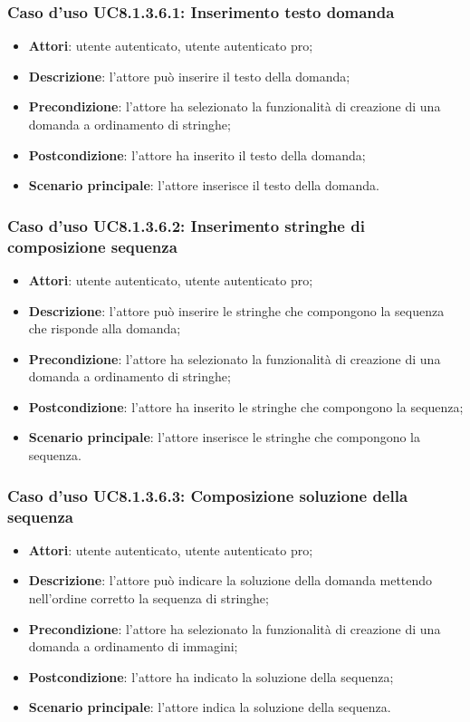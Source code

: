 \subsubsection{Caso d'uso UC8.1.3.6.1: Inserimento testo domanda}
	\begin{itemize}
		\item \textbf{Attori}: utente autenticato, utente autenticato pro;
		\item \textbf{Descrizione}: l'attore può inserire il testo della domanda;
		\item\textbf{Precondizione}: l'attore ha selezionato la funzionalità di creazione di una domanda a ordinamento di stringhe;
		\item \textbf{Postcondizione}: l'attore ha inserito il testo della domanda;
		\item\textbf{Scenario principale}: l'attore inserisce il testo della domanda.
	\end{itemize}
	
\subsubsection{Caso d'uso UC8.1.3.6.2: Inserimento stringhe di composizione sequenza}
	\begin{itemize}
		\item \textbf{Attori}: utente autenticato, utente autenticato pro;
		\item \textbf{Descrizione}: l'attore può inserire le stringhe che compongono la sequenza che risponde alla domanda;
		\item\textbf{Precondizione}: l'attore ha selezionato la funzionalità di creazione di una domanda a ordinamento di stringhe;
		\item \textbf{Postcondizione}: l'attore ha inserito le stringhe che compongono la sequenza;
		\item\textbf{Scenario principale}: l'attore inserisce le stringhe che compongono la sequenza.
	\end{itemize}
	
\subsubsection{Caso d'uso UC8.1.3.6.3: Composizione soluzione della sequenza}
	\begin{itemize}
		\item \textbf{Attori}: utente autenticato, utente autenticato pro;
		\item \textbf{Descrizione}: l'attore può indicare la soluzione della domanda mettendo nell'ordine corretto la sequenza di stringhe;
		\item\textbf{Precondizione}: l'attore ha selezionato la funzionalità di creazione di una domanda a ordinamento di immagini;
		\item \textbf{Postcondizione}: l'attore ha indicato la soluzione della sequenza;
		\item\textbf{Scenario principale}: l'attore indica la soluzione della sequenza. 
	\end{itemize}